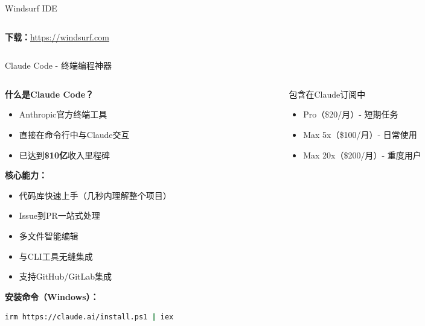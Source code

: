 \documentclass[aspectratio=169,11pt]{beamer}
\begin{document}
\begin{frame}{Windsurf IDE}
\begin{columns}
\begin{column}{0.45\textwidth}
            \vspace{0.2cm}
            \textbf{下载：}\url{https://windsurf.com}
        \end{column}
    \end{columns}
\end{frame}

\begin{frame}[fragile]{Claude Code - 终端编程神器}
    \begin{columns}
        \begin{column}{0.55\textwidth}
            \textbf{什么是Claude Code？}
            \begin{itemize}
                \item Anthropic官方终端工具
                \item 直接在命令行中与Claude交互
                \item 已达到\textbf{\$10亿}收入里程碑
            \end{itemize}
            
            \vspace{0.3cm}
            \textbf{核心能力：}
            \begin{itemize}
                \item 代码库快速上手（几秒内理解整个项目）
                \item Issue到PR一站式处理
                \item 多文件智能编辑
                \item 与CLI工具无缝集成
                \item 支持GitHub/GitLab集成
            \end{itemize}
            
            \vspace{0.3cm}
            \textbf{安装命令（Windows）：}
            \begin{lstlisting}[language=bash]
irm https://claude.ai/install.ps1 | iex
            \end{lstlisting}
        \end{column}
        \begin{column}{0.45\textwidth}
            \begin{block}{包含在Claude订阅中}
                \begin{itemize}
                    \item Pro（\$20/月）- 短期任务
                    \item Max 5x（\$100/月）- 日常使用
                    \item Max 20x（\$200/月）- 重度用户
                \end{itemize}
            \end{block}
            

\end{column}
\end{columns}
\end{frame}
\end{document}
